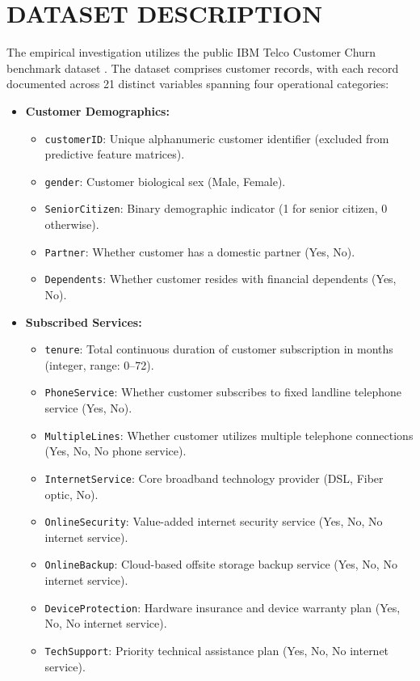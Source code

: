 \section{DATASET DESCRIPTION}
The empirical investigation utilizes the public IBM Telco Customer Churn benchmark dataset \citep{ibm2019telco}. The dataset comprises \datasetTotalRows{} customer records, with each record documented across 21 distinct variables spanning four operational categories:
\begin{itemize}
    \item \textbf{Customer Demographics:}
    \begin{itemize}
        \item \texttt{customerID}: Unique alphanumeric customer identifier (excluded from predictive feature matrices).
        \item \texttt{gender}: Customer biological sex (Male, Female).
        \item \texttt{SeniorCitizen}: Binary demographic indicator (1 for senior citizen, 0 otherwise).
        \item \texttt{Partner}: Whether customer has a domestic partner (Yes, No).
        \item \texttt{Dependents}: Whether customer resides with financial dependents (Yes, No).
    \end{itemize}
    \item \textbf{Subscribed Services:}
    \begin{itemize}
        \item \texttt{tenure}: Total continuous duration of customer subscription in months (integer, range: 0--72).
        \item \texttt{PhoneService}: Whether customer subscribes to fixed landline telephone service (Yes, No).
        \item \texttt{MultipleLines}: Whether customer utilizes multiple telephone connections (Yes, No, No phone service).
        \item \texttt{InternetService}: Core broadband technology provider (DSL, Fiber optic, No).
        \item \texttt{OnlineSecurity}: Value-added internet security service (Yes, No, No internet service).
        \item \texttt{OnlineBackup}: Cloud-based offsite storage backup service (Yes, No, No internet service).
        \item \texttt{DeviceProtection}: Hardware insurance and device warranty plan (Yes, No, No internet service).
        \item \texttt{TechSupport}: Priority technical assistance plan (Yes, No, No internet service).

\end{itemize}
\end{itemize}
